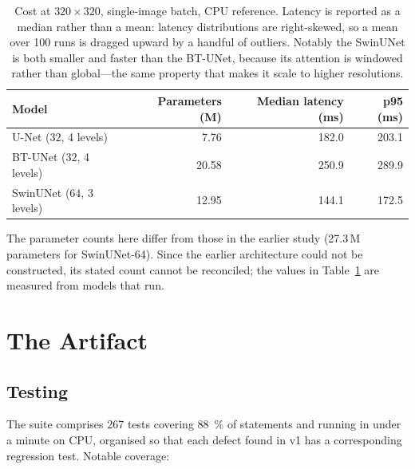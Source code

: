\documentclass[11pt]{article}
\begin{document}
\begin{table}[h]
\centering
\small
\begin{tabular}{@{}lrrr@{}}
\toprule
Model & Parameters (M) & Median latency (ms) & p95 (ms) \\
\midrule
U-Net ($32$, 4 levels)      & 7.76  & 182.0 & 203.1 \\
BT-UNet ($32$, 4 levels)    & 20.58 & 250.9 & 289.9 \\
SwinUNet ($64$, 3 levels)   & 12.95 & 144.1 & 172.5 \\
\bottomrule
\end{tabular}
\caption{Cost at $320\times320$, single-image batch, CPU reference. Latency is
reported as a median rather than a mean: latency distributions are right-skewed,
so a mean over 100 runs is dragged upward by a handful of outliers. Notably the
SwinUNet is both smaller and faster than the BT-UNet, because its attention is
windowed rather than global---the same property that makes it scale to higher
resolutions.}
\label{tab:cost}
\end{table}

The parameter counts here differ from those in the earlier study
(27.3\,M parameters for SwinUNet-64). Since the earlier architecture could
not be constructed, its stated count cannot be reconciled; the values in
Table~\ref{tab:cost} are measured from models that run.

\section{The Artifact}
\label{sec:artifact}

\subsection{Testing}

The suite comprises 267 tests covering \SI{88}{\percent} of statements and
running in under a minute on CPU, organised
so that each defect found in v1 has a corresponding regression test.
Notable coverage:
\end{document}
